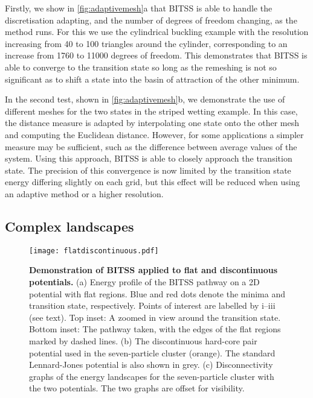 \documentclass[twocolumn,10pt]{revtex4}
\begin{document}
Firstly, we show in \cref{fig:adaptivemesh}a that BITSS is able to handle the discretisation adapting, and the number of degrees of freedom changing, as the method runs.
For this we use the cylindrical buckling example with the resolution increasing from 40 to 100 triangles around the cylinder, corresponding to an increase from \num{1760} to \num{11000} degrees of freedom.
This demonstrates that BITSS is able to converge to the transition state so long as the remeshing is not so significant as to shift a state into the basin of attraction of the other minimum.

In the second test, shown in \cref{fig:adaptivemesh}b, we demonstrate the use of different meshes for the two states in the striped wetting example.
In this case, the distance measure is adapted by interpolating one state onto the other mesh and computing the Euclidean distance.
However, for some applications a simpler measure may be sufficient, such as the difference between average values of the system.
Using this approach, BITSS is able to closely approach the transition state.
The precision of this convergence is now limited by the transition state energy differing slightly on each grid, but this effect will be reduced when using an adaptive method or a higher resolution.


\subsection{Complex landscapes}
\begin{figure}[tb]
  \texttt{[image: flatdiscontinuous.pdf]}
  \caption{\label{fig:flatdiscontinuous}
    \textbf{Demonstration of BITSS applied to flat and discontinuous potentials.}
    (a) Energy profile of the BITSS pathway on a 2D potential with flat regions.
        Blue and red dots denote the minima and transition state, respectively.
        Points of interest are labelled by i--iii (see text).
        Top inset: A zoomed in view around the transition state.
        Bottom inset: The pathway taken, with the edges of the flat regions marked by dashed lines.
    (b) The discontinuous hard-core pair potential used in the seven-particle cluster (orange).
        The standard Lennard-Jones potential is also shown in grey.
    (c) Disconnectivity graphs of the energy landscapes for the seven-particle cluster with the two potentials.
        The two graphs are offset for visibility.
  }
\end{figure}
\end{document}
